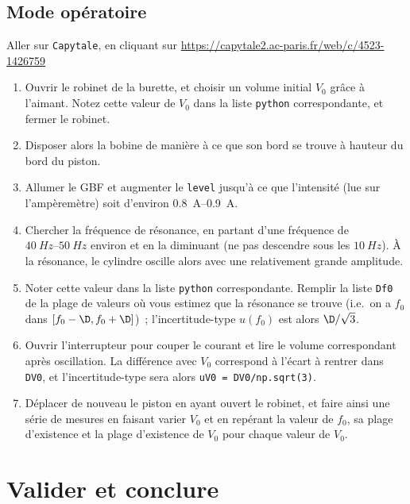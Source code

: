 \documentclass[a4paper, 11pt, final, garamond]{book}
\begin{document}
\subsection{Mode opératoire}
Aller sur \texttt{Capytale}, en cliquant sur
\url{https://capytale2.ac-paris.fr/web/c/4523-1426759}
\begin{enumerate}
    \item Ouvrir le robinet de la burette, et choisir un volume initial $V_0$
        grâce à l'aimant. Notez cette valeur de $V_0$ dans la liste
        \texttt{python} correspondante, et fermer le robinet.
    \item Disposer alors la bobine de manière à ce que son bord se trouve à
        hauteur du bord du piston.
    \item Allumer le GBF et augmenter le \texttt{level} jusqu'à ce que
        l'intensité (lue sur l'ampèremètre) soit d'environ
        \SIrange{0.8}{0.9}{A}.
    \item Chercher la fréquence de résonance, en partant d'une fréquence de
        $\SIrange{40}{50}{Hz}$ environ et en la diminuant (ne pas descendre sous
        les $\SI{10}{Hz}$). À la résonance, le cylindre oscille alors avec une
        relativement grande amplitude.
    \item Noter cette valeur dans la liste \texttt{python} correspondante.
        Remplir la liste \texttt{Df0} de la plage de valeurs où vous estimez que
        la résonance se trouve (i.e.\ on a $f_0$ dans $[f_0 -\D, f_0 +\D]$)~;
        l'incertitude-type $u(f_0)$ est alors $\D/\sqrt{3}$.
    \item Ouvrir l'interrupteur pour couper le courant et lire le volume
        correspondant après oscillation. La différence avec $V_0$ correspond à
        l'écart à rentrer dans \texttt{DV0}, et l'incertitude-type sera alors
        \texttt{uV0 = DV0/np.sqrt(3)}.
    \item Déplacer de nouveau le piston en ayant ouvert le robinet, et faire
        ainsi une série de mesures en faisant varier $V_0$ et en repérant la
        valeur de $f_0$, sa plage d'existence et la plage d'existence de $V_0$
        pour chaque valeur de $V_0$.
\end{enumerate}

\section{Valider et conclure}
\end{document}
